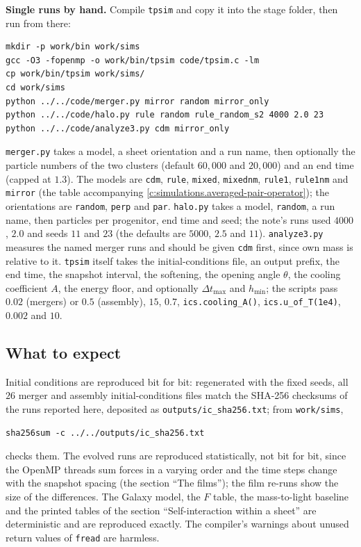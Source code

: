 \documentclass[11pt]{article}
\theoremstyle{definition}
\theoremstyle{plain}
\providecommand{\file}{}\renewcommand{\file}[1]{\texttt{#1}}
\begin{document}
\label{c:note.simulations.setting-running-2}
\textbf{Single runs by hand.} Compile \file{tpsim} and copy it into the stage folder, then run from there:
{ \begin{verbatim}
mkdir -p work/bin work/sims
gcc -O3 -fopenmp -o work/bin/tpsim code/tpsim.c -lm
cp work/bin/tpsim work/sims/
cd work/sims
python ../../code/merger.py mirror random mirror_only
python ../../code/halo.py rule random rule_random_s2 4000 2.0 23
python ../../code/analyze3.py cdm mirror_only
\end{verbatim}}
\file{merger.py} takes a model, a sheet orientation and a run name, then optionally the particle numbers of the two clusters (default $60{,}000$ and $20{,}000$) and an end time (capped at $1.3$). The models are \texttt{cdm}, \texttt{rule}, \texttt{mixed}, \texttt{mixednm}, \texttt{rule1}, \texttt{rule1nm} and \texttt{mirror} (the table accompanying \ref{c:simulations.averaged-pair-operator}); the orientations are \texttt{random}, \texttt{perp} and \texttt{par}. \file{halo.py} takes a model, \texttt{random}, a run name, then particles per progenitor, end time and seed; the note's runs used $4000$, $2.0$ and seeds $11$ and $23$ (the defaults are $5000$, $2.5$ and $11$). \file{analyze3.py} measures the named merger runs and should be given \texttt{cdm} first, since own mass is relative to it. \file{tpsim} itself takes the initial-conditions file, an output prefix, the end time, the snapshot interval, the softening, the opening angle $\theta$, the cooling coefficient $A$, the energy floor, and optionally $\Delta t_{\max}$ and $h_{\min}$; the scripts pass $0.02$ (mergers) or $0.5$ (assembly), $15$, $0.7$, \texttt{ics.cooling\_A()}, \texttt{ics.u\_of\_T(1e4)}, $0.002$ and $10$.

\subsection*{What to expect}
\label{c:note.simulations.setting-what-expect}
Initial conditions are reproduced bit for bit: regenerated with the fixed seeds, all $26$ merger and assembly initial-conditions files match the SHA-256 checksums of the runs reported here, deposited as \file{outputs/ic\_sha256.txt}; from \file{work/sims},
{ \begin{verbatim}
sha256sum -c ../../outputs/ic_sha256.txt
\end{verbatim}}
\noindent checks them. The evolved runs are reproduced statistically, not bit for bit, since the OpenMP threads sum forces in a varying order and the time steps change with the snapshot spacing (the section ``The films''); the film re-runs show the size of the differences. The Galaxy model, the $F$ table, the mass-to-light baseline and the printed tables of the section ``Self-interaction within a sheet'' are deterministic and are reproduced exactly. The compiler's warnings about unused return values of \texttt{fread} are harmless.
\end{document}
